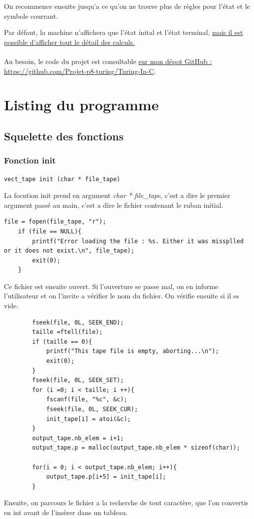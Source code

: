 \documentclass[12pt,a4paper]{report}
\begin{document}
\begin{itemize}
On recommence ensuite jusqu'a ce qu'on ne trouve plus de règles pour l'état et le symbole courrant.

Par défaut, la machine n'affichera que l'état inital et l'état terminal, \hyperref[chap:emploi]{mais il est possible d'afficher tout le détail des calculs.}\\\\
Au besoin, le code du projet est consultable \href{https://github.com/Projet-p8-turing/Turing-In-C}{sur mon dépot GitHub : https://github.com/Projet-p8-turing/Turing-In-C}.
\end{itemize}
\chapter{Listing du programme}
\section{Squelette des fonctions}
\subsection{Fonction init}
\begin{verbatim}
vect_tape init (char * file_tape)
\end{verbatim}

La focntion init prend en argument \textit{char * file\_tape}, c'est a dire le premier argument passé au main, c'est a dire le fichier contenant le ruban initial.\\
\begin{lstlisting}
file = fopen(file_tape, "r"); 
    if (file == NULL){ 
        printf("Error loading the file : %s. Either it was missplled or it does not exist.\n", file_tape); 
        exit(0);
    }
\end{lstlisting}
Ce fichier est ensuite ouvert. Si l'ouverture se passe mal, on en informe l'utilisateur et on l'invite a vérifier le nom du fichier. On vérifie ensuite si il es vide.\\
\begin{lstlisting}
        fseek(file, 0L, SEEK_END);
        taille =ftell(file);
        if (taille == 0){
            printf("This tape file is empty, aborting...\n");
            exit(0);
        }
        fseek(file, 0L, SEEK_SET);
        for (i =0; i < taille; i ++){
            fscanf(file, "%c", &c);
            fseek(file, 0L, SEEK_CUR);
            init_tape[i] = atoi(&c); 
        }	
        output_tape.nb_elem = i+1;
        output_tape.p = malloc(output_tape.nb_elem * sizeof(char));

        for(i = 0; i < output_tape.nb_elem; i++){
            output_tape.p[i+5] = init_tape[i];
        }
\end{lstlisting}
Ensuite, on parcours le fichier a la recherche de tout caractère, que l'on convertis en int avant de l'insèrer dans un tableau.\\
\end{document}
